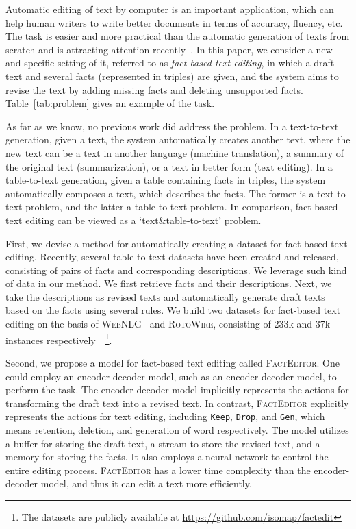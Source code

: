 \documentclass[11pt,a4paper]{article}
\begin{document}
Automatic editing of text by computer is an important application, which can help human writers to write better documents in terms of accuracy, fluency, etc. The task is easier and more practical than the automatic generation of texts from scratch and is attracting attention recently~\cite{yang2017identifying,yin2019learning}. In this paper, we consider a new and specific setting of it, referred to as {\em fact-based text editing}, in which a draft text and several facts (represented in triples) are given, and the system aims to revise the text by adding missing facts and deleting unsupported facts. Table~\ref{tab:problem} gives an example of the task.

As far as we know, no previous work did address the problem. In a text-to-text generation, given a text, the system automatically creates another text, where the new text can be a text in another language (machine translation), a summary of the original text (summarization), or a text in better form (text editing). In a table-to-text generation, given a table containing facts in triples, the system automatically composes a text, which describes the facts. The former is a text-to-text problem, and the latter a table-to-text problem. In comparison, fact-based text editing can be viewed as a `text\&table-to-text' problem.

First, we devise a method for automatically creating a dataset for fact-based text editing. 
Recently, several table-to-text datasets have been created and released, consisting of pairs of facts and corresponding descriptions.
We leverage such kind of data in our method. We first retrieve facts and their descriptions. Next, we take the descriptions as revised texts and automatically generate draft texts based on the facts using several rules. We build two datasets for fact-based text editing on the basis of \textsc{WebNLG}~\cite{gardent-etal-2017-creating} and \textsc{RotoWire}, consisting of 233k and 37k instances respectively~\cite{wiseman2017challenges}~\footnote{The datasets are publicly available at \url{https://github.com/isomap/factedit}}.

Second, we propose a model for fact-based text editing called \textsc{FactEditor}. One could employ an encoder-decoder model, such as an encoder-decoder model, to perform the task.
The encoder-decoder model implicitly represents the actions for transforming the draft text into a revised text. In contrast, \textsc{FactEditor} explicitly represents the actions for text editing, including \texttt{Keep}, \texttt{Drop}, and \texttt{Gen}, which means retention, deletion, and generation of word respectively. The model utilizes a buffer for storing the draft text, a stream to store the revised text, and a memory for storing the facts.  It also employs a neural network to control the entire editing process. \textsc{FactEditor} has a lower time complexity than the encoder-decoder model, and thus it can edit a text more efficiently.
\end{document}
